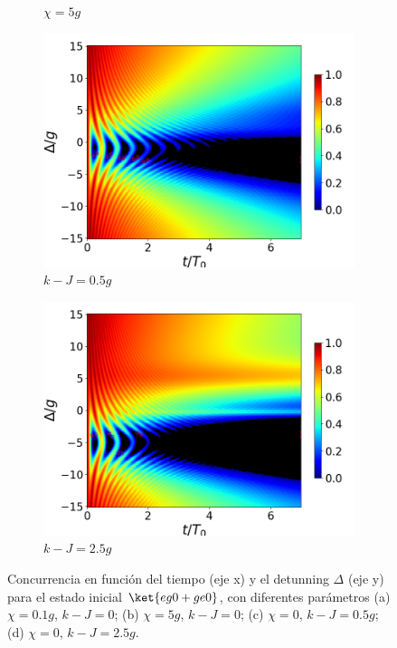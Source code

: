 \begin{figure}[h]
\begin{subfigure}{0.49\textwidth}
        \caption{$\chi=5g$}
        \label{fig4:concu detunning x2}
    \end{subfigure}
    \vfill
    \begin{subfigure}{0.49\textwidth}
        \includegraphics[width=\textwidth]{figuras/ch4/concu/delta/eg0+ge0 k=0.5g x=0.0g J=0.0g gamma=0.25g concu delta dis.png}
        \caption{$k-J=0.5g$}
        \label{fig4:concu detunning k1}
    \end{subfigure}
    \hfill
    \begin{subfigure}{0.49\textwidth}
        \includegraphics[width=\textwidth]{figuras/ch4/concu/delta/eg0+ge0 k=2.5g x=0.0g J=0.0g gamma=0.25g concu delta dis.png}
        \caption{$k-J=2.5g$}
        \label{fig4:concu detunning k2}
    \end{subfigure}
    \caption{Concurrencia en función del tiempo (eje x) y el detunning $\Delta$ (eje y) para el estado inicial $\ket{eg0+ge0}$, con diferentes parámetros (a) $\chi=0.1g$, $k-J=0$; (b) $\chi=5g$, $k-J=0$; (c) $\chi=0$, $k-J=0.5g$; (d) $\chi=0$, $k-J=2.5g$.}
    \label{fig4:concu detunning 0 params}
\end{figure}
